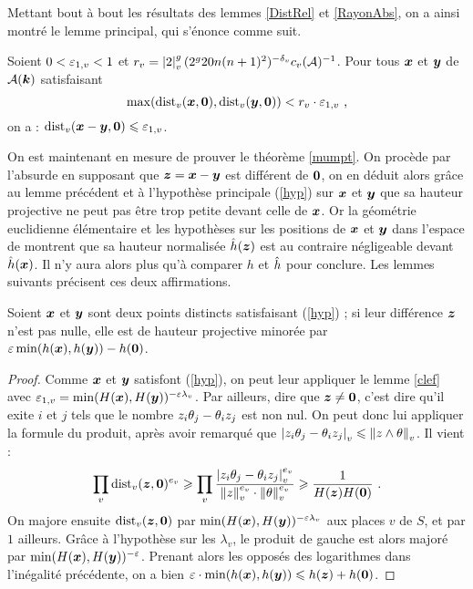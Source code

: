 Mettant bout à bout les résultats des lemmes \ref{DistRel} et \ref{RayonAbs},
on a ainsi montré le lemme principal, qui s'énonce comme suit.

\begin{lem} \label{clef}
  Soient $0 < \varepsilon_{1,v} < 1$ et $r_v = \left\lvert2\right\rvert_{v}^g
  (2^g20n(n+1)^2)^{-{\delta_v}}c_v(\mathcal{A})^{-1}$. Pour tous ${\boldsymbol{x}}$ et ${\boldsymbol{y}}$ de
  $\mathcal{A}(\boldsymbol{k})$ satisfaisant
  \[
  \max ( \mathrm{dist}_v({\boldsymbol{x}}, {\boldsymbol{0}}), \mathrm{dist}_v({\boldsymbol{y}}, {\boldsymbol{0}}) ) < r_v \cdot \varepsilon_{1,v} \text{ ,}
  \]
  on a : $\mathrm{dist}_v({\boldsymbol{x}}-{\boldsymbol{y}}, {\boldsymbol{0}}) \leqslant \varepsilon_{1,v}$.
\end{lem}

On est maintenant en mesure de prouver le théorème \ref{mumpt}. On procède par
l'absurde en supposant que ${\boldsymbol{z}} = {\boldsymbol{x}} - {\boldsymbol{y}}$ est différent de ${\boldsymbol{0}}$, on
en déduit alors grâce au lemme précédent et à l'hypothèse principale
(\ref{hyp}) sur ${\boldsymbol{x}}$ et ${\boldsymbol{y}}$ que sa hauteur projective ne peut pas être
trop petite devant celle de ${\boldsymbol{x}}$. Or la géométrie euclidienne élémentaire
et les hypothèses sur les positions de ${\boldsymbol{x}}$ et ${\boldsymbol{y}}$ dans l'espace de
 montrent que sa hauteur normalisée $\hat{h}({\boldsymbol{z}})$ est au
contraire négligeable devant $\hat{h}({\boldsymbol{x}})$. Il n'y aura alors plus qu'à
comparer $h$ et $\hat{h}$ pour conclure. Les lemmes suivants précisent ces deux
affirmations.

\begin{lem} \label{papti}
  Soient ${\boldsymbol{x}}$ et ${\boldsymbol{y}}$ sont deux points distincts satisfaisant
  (\ref{hyp}) ; si leur différence ${\boldsymbol{z}}$ n'est pas nulle, elle est de hauteur
  projective minorée par $\varepsilon \min(h({\boldsymbol{x}}), h({\boldsymbol{y}})) - h({\boldsymbol{0}})$.
\end{lem}

\begin{proof}
  Comme ${\boldsymbol{x}}$ et ${\boldsymbol{y}}$ satisfont (\ref{hyp}), on peut leur appliquer le
  lemme \ref{clef} avec $\varepsilon_{1, v} = \min(H({\boldsymbol{x}}),
  H({\boldsymbol{y}}))^{-\varepsilon\lambda_v}$. Par ailleurs, dire que ${\boldsymbol{z}} \neq {\boldsymbol{0}}$, c'est
  dire qu'il exite $i$ et $j$ tels que le nombre $z_i \theta_j - \theta_i z_j$ est
  non nul. On peut donc lui appliquer la formule du produit, après avoir
  remarqué que $\left\lvert z_i \theta_j - \theta_i z_j\right\rvert_{v} \leqslant \left\lVert z\wedge \theta\right\rVert_{v}$. Il vient
  :
  \[
  \prod_v \mathrm{dist}_v({\boldsymbol{z}}, {\boldsymbol{0}})^{e_v} \geqslant \prod_v \frac{\left\lvert z_i \theta_j - \theta_i
    z_j\right\rvert_{v}^{e_v}}{\left\lVert z\right\rVert_{v}^{e_v}\cdot\left\lVert\theta\right\rVert_{v}^{e_v}} \geqslant \frac{1}{H({\boldsymbol{z}})
    H({\boldsymbol{0}})} \text{ .}
  \]
  On majore ensuite $\mathrm{dist}_v({\boldsymbol{z}}, {\boldsymbol{0}})$ par $\min(H({\boldsymbol{x}}),
  H({\boldsymbol{y}}))^{-\varepsilon\lambda_v}$ aux places $v$ de $S$, et par $1$ ailleurs.
  Grâce à l'hypothèse sur les $\lambda_v$, le produit de gauche est alors
  majoré par $\min(H({\boldsymbol{x}}), H({\boldsymbol{y}}))^{-\varepsilon}$. Prenant alors les opposés des
  logarithmes dans l'inégalité précédente, on a bien $\varepsilon \cdot
  \min(h({\boldsymbol{x}}), h({\boldsymbol{y}})) \leqslant h({\boldsymbol{z}}) + h({\boldsymbol{0}})$.
\end{proof}

